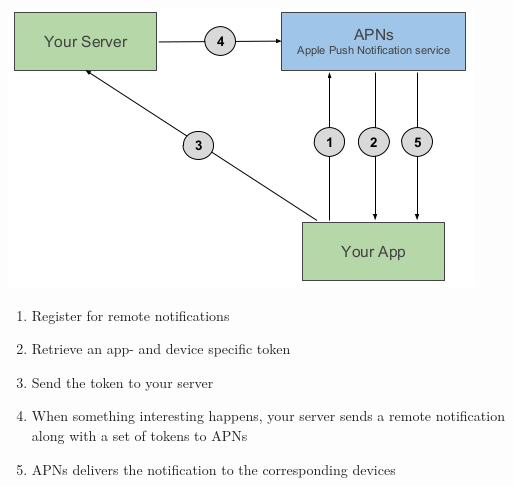 \begin{breakbox}

\includegraphics[width=.15\textwidth]{figures/remoteNotification.png}

\begin{enumerate}
\def\labelenumi{\arabic{enumi}.}
\tightlist
\item
  Register for remote notifications
\item
  Retrieve an app- and device specific token
\item
  Send the token to your server
\item
  When something interesting happens, your server sends a remote
  notification along with a set of tokens to APNs
\item
  APNs delivers the notification to the corresponding devices
\end{enumerate}
\end{breakbox}